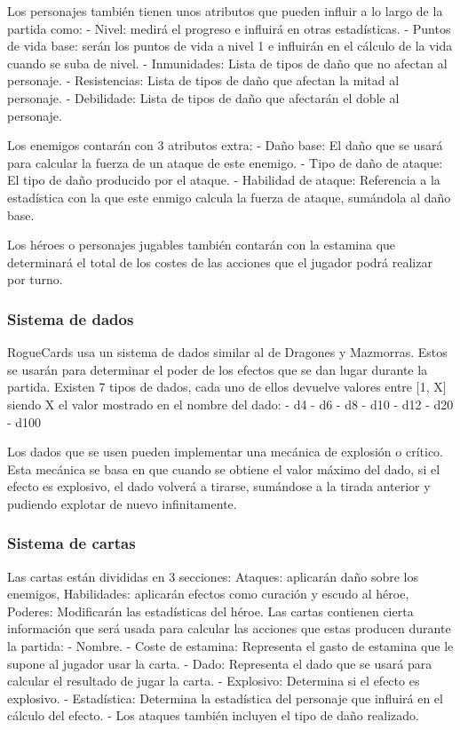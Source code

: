 Los personajes también tienen unos atributos que pueden influir a lo largo de la partida como:
- Nivel: medirá el progreso e influirá en otras estadísticas.
- Puntos de vida base: serán los puntos de vida a nivel 1 e influirán en el cálculo de la vida cuando se suba de nivel.
- Inmunidades: Lista de tipos de daño que no afectan al personaje.
- Resistencias: Lista de tipos de daño que afectan la mitad al personaje.
- Debilidade: Lista de tipos de daño que afectarán el doble al personaje.

Los enemigos contarán con 3 atributos extra: 
- Daño base: El daño que se usará para calcular la fuerza de un ataque de este enemigo.
- Tipo de daño de ataque: El tipo de daño producido por el ataque.
- Habilidad de ataque: Referencia a la estadística con la que este enmigo calcula la fuerza de ataque, sumándola al daño base.

Los héroes o personajes jugables también contarán con la estamina que determinará el total de los costes de las acciones que el jugador podrá realizar por turno.

\subsubsection{Sistema de dados}
RogueCards usa un sistema de dados similar al de Dragones y Mazmorras. Estos se usarán para determinar el poder de los efectos que se dan lugar durante la partida. Existen 7 tipos de dados, cada uno de ellos devuelve valores entre [1, X] siendo X el valor mostrado en el nombre del dado: 
- d4
- d6
- d8
- d10
- d12
- d20
- d100

Los dados que se usen pueden implementar una mecánica de explosión o crítico. Esta mecánica se basa en que cuando se obtiene el valor máximo del dado, si el efecto es explosivo, el dado volverá a tirarse, sumándose a la tirada anterior y pudiendo explotar de nuevo infinitamente.

\subsubsection{Sistema de cartas}
Las cartas están divididas en 3 secciones: Ataques: aplicarán daño sobre los enemigos, Habilidades: aplicarán efectos como curación y escudo al héroe, Poderes: Modificarán las estadísticas del héroe.
Las cartas contienen cierta información que será usada para calcular las acciones que estas producen durante la partida: 
- Nombre.
- Coste de estamina: Representa el gasto de estamina que le supone al jugador usar la carta.
- Dado: Representa el dado que se usará para calcular el resultado de jugar la carta. 
- Explosivo: Determina si el efecto es explosivo.
- Estadística: Determina la estadística del personaje que influirá en el cálculo del efecto.
- Los ataques también incluyen el tipo de daño realizado.

